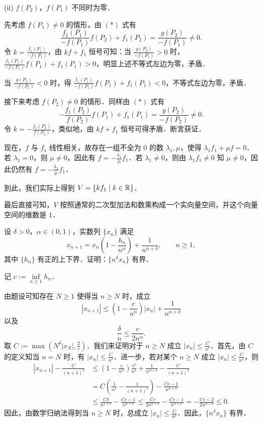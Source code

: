 \begin{solution}
(ii) $f(P_2)$，$f(P_1)$ 不同时为零．

先考虑 $f(P_1)\ne0$ 的情形，由 $(*)$ 式有
\[
  \frac{f_1(P_1)}{-f(P_1)}f(P_2)+f_1(P_2)=\frac{g(P_2)}{-f(P_1)}\ne0.
\]
令 $k=\frac{f_1(P_1)}{-f(P_1)}$，由 $kf+f_1$ 恒号可知：当 $\frac{g(P_2)}{-f(P_1)}>0$ 时，$\frac{f_1(P_1)}{-f(P_1)}f(P_1)+f_1(P_1)>0$，明显上述不等式左边为零，矛盾．

当 $\frac{g(P_2)}{-f(P_1)}<0$ 时，得 $\frac{f_1(P_1)}{-f(P_1)}f(P_1)+f_1(P_1)<0$，不等式左边为零，矛盾．

接下来考虑 $f(P_2)\ne0$ 的情形．同样由 $(*)$ 式有
\[
  -\frac{f_1(P_2)}{f(P_2)}f(P_1)+f_1(P_1)=\frac{g(P_2)}{-f(P_2)}\ne0.
\]
令 $k=-\frac{f_1(P_2)}{f(P_2)}$，类似地，由 $kf+f_1$ 恒号可得矛盾．断言获证．

现在，$f$ 与 $f_1$ 线性相关，故存在一组不全为 $0$ 的数 $\lambda_1,\mu$，使得 $\lambda_1f_1+\mu f=0$．若 $\lambda_1=0$，则 $\mu\ne0$，因此有 $f=-\frac{\lambda_1}{\mu}f_1$．若 $\lambda_1\ne0$，则由 $\lambda_1f_1\ne0$ 知 $\mu\ne0$，因此仍然有 $f=-\frac{\lambda_1}{\mu}f_1$．

到此，我们实际上得到 $V=\{kf_1\mid k\in\mathbb{R}\}$．

最后直接可知，$V$ 按照通常的二次型加法和数乘构成一个实向量空间，并这个向量空间的维数是 $1$．
\end{solution}

设 $\delta>0$，$\alpha\in(0,1)$，实数列 $\{x_n\}$ 满足
\[
  x_{n+1}=x_n\left(1-\frac{h_n}{n^{\alpha}}\right)+\frac{1}{n^{\alpha+\delta}},\qquad n\ge1,
\]
其中 $\{h_n\}$ 有正的上下界．证明：$\{n^{\delta}x_n\}$ 有界．

\begin{solution}
记 $c:=\inf\limits_{n\ge1}h_n$．

由题设可知存在 $N\ge1$ 使得当 $n\ge N$ 时，成立
\[
  |x_{n+1}|\le\left(1-\frac{c}{n^{\alpha}}\right)|x_n|+\frac{1}{n^{\alpha+\delta}}
\]
以及
\[
  \frac{\delta}{n}\le\frac{c}{2n^{\alpha}}.
\]
取 $C:=\max\left(N^{\delta}|x_N|,\frac2c\right)$．我们来证明对于 $n\ge N$ 成立 $|x_n|\le\frac{C}{n^{\delta}}$．首先，由 $C$ 的定义知当 $n=N$ 时，有 $|x_n|\le\frac{C}{n^{\delta}}$．进一步，若对某个 $n\ge N$ 成立 $|x_n|\le\frac{C}{n^{\delta}}$，则
\begin{align*}
  |x_{n+1}|-\frac{C}{(n+1)^{\delta}}
  &\le\left(1-\frac{c}{n^{\alpha}}\right)\frac{C}{n^{\delta}}+\frac{1}{n^{\alpha+\delta}}-\frac{C}{(n+1)^{\delta}}\\
  &=C\left(\frac{1}{n^{\delta}}-\frac{1}{(n+1)^{\delta}}\right)-\frac{Cc-1}{n^{\alpha+\delta}}\\
  &\le\frac{C\delta}{n^{1+\delta}}-\frac{Cc-1}{n^{\alpha+\delta}}
   \le\frac{Cc}{2n^{\alpha+\delta}}-\frac{Cc-1}{n^{\alpha+\delta}}
   =-\frac{Cc-2}{2n^{\alpha+\delta}}\le0.
\end{align*}
因此，由数学归纳法得到当 $n\ge N$ 时，总成立 $|x_n|\le\frac{C}{n^{\delta}}$．因此，$\{n^{\delta}x_n\}$ 有界．
\end{solution}

